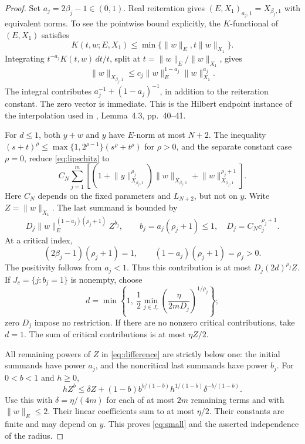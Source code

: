\documentclass[11pt]{amsart}
\theoremstyle{definition}
\theoremstyle{remark}
\newcommand{\norm}[2][]{\lVert #2\rVert_{#1}}
\numberwithin{equation}{section}
\begin{document}
\begin{proof}
Set $a_j=2\beta_j-1\in(0,1)$. Real reiteration gives
$(E,X_1)_{a_j,1}=X_{\beta_j,1}$ with equivalent norms. To see the
pointwise bound explicitly, the $K$-functional of $(E,X_1)$ satisfies
\[
 K(t,w;E,X_1)\le\min\{\norm[E]{w},t\norm[X_1]{w}\}.
\]
Integrating $t^{-a_j}K(t,w)\,dt/t$, split at
$t=\norm[E]{w}/\norm[X_1]{w}$, gives
\begin{equation}\label{eq:interpolation}
 \norm[X_{\beta_j,1}]{w}
 \le c_j\norm[E]{w}^{1-a_j}\norm[X_1]{w}^{a_j}.
\end{equation}
The integral contributes $a_j^{-1}+(1-a_j)^{-1}$, in addition to the
reiteration constant. The zero vector is immediate. This is the Hilbert
endpoint instance of the interpolation used in \cite{Survey}, Lemma~4.3,
pp.~40--41.

For $d\le1$, both $y+w$ and $y$ have $E$-norm at most $N+2$.
The inequality $(s+t)^\rho\le\max\{1,2^{\rho-1}\}(s^\rho+t^\rho)$ for
$\rho>0$, and the separate constant case $\rho=0$, reduce
\eqref{eq:lipschitz} to
\begin{equation}\label{eq:difference}
 C_N\sum_{j=1}^m\left[
 (1+\norm[X_{\beta_j,1}]{y}^{\rho_j})
       \norm[X_{\beta_j,1}]{w}
 +\norm[X_{\beta_j,1}]{w}^{\rho_j+1}\right].
\end{equation}
Here $C_N$ depends on the fixed parameters and $L_{N+2}$, but not on $y$.
Write $Z=\norm[X_1]{w}$. The last summand is bounded by
\begin{equation}\label{eq:powers}
 D_j\norm[E]{w}^{(1-a_j)(\rho_j+1)}Z^{b_j},
 \qquad b_j=a_j(\rho_j+1)\le1,\quad D_j=C_Nc_j^{\rho_j+1}.
\end{equation}
At a critical index,
\begin{equation}\label{eq:equality}
 (2\beta_j-1)(\rho_j+1)=1,
 \qquad(1-a_j)(\rho_j+1)=\rho_j>0.
\end{equation}
The positivity follows from $a_j<1$. Thus this contribution is at most
$D_j(2d)^{\rho_j}Z$.
If $J_c=\{j:b_j=1\}$ is nonempty, choose
\begin{equation}\label{eq:radius}
 d=\min\left\{1,\ \frac12\min_{j\in J_c}
           \left(\frac{\eta}{2mD_j}\right)^{1/\rho_j}\right\};
\end{equation}
zero $D_j$ impose no restriction. If there are no nonzero critical
contributions, take $d=1$. The sum of critical contributions is at most
$\eta Z/2$.

All remaining powers of $Z$ in \eqref{eq:difference} are strictly below
one: the initial summands have power $a_j$, and the noncritical last
summands have power $b_j$. For $0<b<1$ and $h\ge0$,
\[
 hZ^b\le\delta Z+
 (1-b)b^{b/(1-b)}h^{1/(1-b)}\delta^{-b/(1-b)}.
\]
Use this with $\delta=\eta/(4m)$ for each of at most $2m$ remaining
terms and with $\norm[E]{w}\le2$. Their linear coefficients sum to at
most $\eta/2$. Their constants are finite and may depend on $y$.
This proves \eqref{eq:small} and the asserted independence of the radius.
\end{proof}
\end{document}
